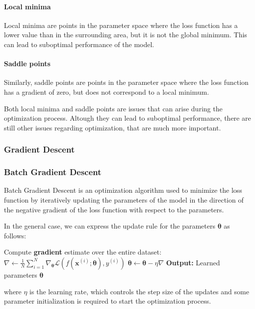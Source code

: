 \paragraph{Local minima} Local minima are points in the parameter space where the loss function has a lower value than in the surrounding area,
but it is not the global minimum. This can lead to suboptimal performance of the model.

\paragraph{Saddle points} Similarly, saddle points are points in the parameter space where the loss function has a gradient of zero,
but does not correspond to a local minimum.

Both local minima and saddle points are issues that can arise during the optimization process. Altough they can lead to suboptimal performance,
there are still other issues regarding optimization, that are much more important.
\subsubsection{Gradient Descent}

\subsubsection*{Batch Gradient Descent}
Batch Gradient Descent is an optimization algorithm used to minimize the loss function by iteratively updating the parameters of the model
in the direction of the negative gradient of the loss function with respect to the parameters.

In the general case, we can express the update rule for the parameters $\boldsymbol{\theta}$ as follows:

\begin{algorithm}[H]
    \caption{Batch Gradient Descent}
    \begin{algorithmic}[1]
            \State Compute \textbf{gradient} estimate over the entire dataset:
            \State $\nabla \leftarrow \frac{1}{N} \sum\limits_{i=1}^{N} \nabla_{\boldsymbol{\theta}} \mathcal{L}(f(\boldsymbol{x}^{(i)}; \boldsymbol{\theta}), y^{(i)})$
            \State $\boldsymbol{\theta} \leftarrow \boldsymbol{\theta} - \eta \nabla$
        \EndWhile
        \State \textbf{Output:} Learned parameters $\boldsymbol{\theta}$
    \end{algorithmic}
\end{algorithm}
where $\eta$ is the learning rate, which controls the step size of the updates and some parameter initialization is required to start the optimization process.

